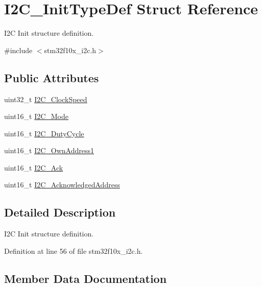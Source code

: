 \hypertarget{struct_i2_c___init_type_def}{}\section{I2\+C\+\_\+\+Init\+Type\+Def Struct Reference}
\label{struct_i2_c___init_type_def}


I2C Init structure definition.  




{\ttfamily \#include $<$stm32f10x\+\_\+i2c.\+h$>$}

\subsection*{Public Attributes}
\begin{DoxyCompactItemize}
\item 
uint32\+\_\+t \hyperlink{struct_i2_c___init_type_def_a737c289f4515ae4cb642db0412762169}{I2\+C\+\_\+\+Clock\+Speed}
\item 
uint16\+\_\+t \hyperlink{struct_i2_c___init_type_def_ad5cf353c5b6968b3610b70ca593cec52}{I2\+C\+\_\+\+Mode}
\item 
uint16\+\_\+t \hyperlink{struct_i2_c___init_type_def_aff23b28652359513dfd268dee54c3279}{I2\+C\+\_\+\+Duty\+Cycle}
\item 
uint16\+\_\+t \hyperlink{struct_i2_c___init_type_def_a08543cb71b4b2a89ad81a2cefff12b53}{I2\+C\+\_\+\+Own\+Address1}
\item 
uint16\+\_\+t \hyperlink{struct_i2_c___init_type_def_a7bcae26f098e897832e5e42b055f8c98}{I2\+C\+\_\+\+Ack}
\item 
uint16\+\_\+t \hyperlink{struct_i2_c___init_type_def_a300e847972f50b0d25c4f13be5d93d79}{I2\+C\+\_\+\+Acknowledged\+Address}
\end{DoxyCompactItemize}


\subsection{Detailed Description}
I2C Init structure definition. 

Definition at line 56 of file stm32f10x\+\_\+i2c.\+h.



\subsection{Member Data Documentation}
\mbox{\label{struct_i2_c___init_type_def_a7bcae26f098e897832e5e42b055f8c98}} 
